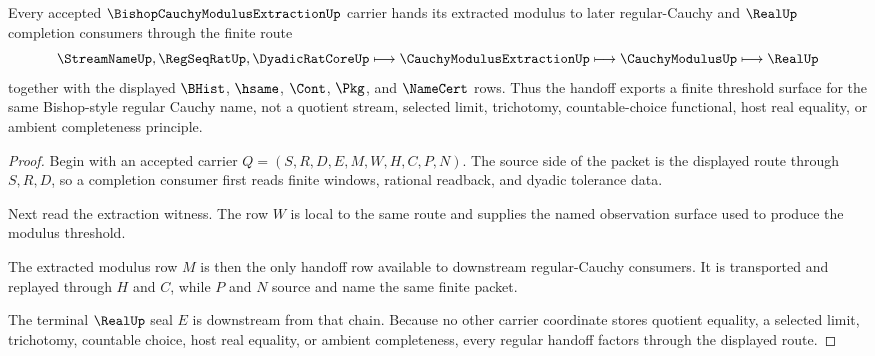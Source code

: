 \begin{theorem}
\label{thm:bishop-cauchy-modulus-extraction-regular-handoff}
Every accepted $\BishopCauchyModulusExtractionUp$ carrier hands its extracted modulus to later regular-Cauchy and $\RealUp$ completion consumers through the finite route
$$
\StreamNameUp,\RegSeqRatUp,\DyadicRatCoreUp
\longmapsto
\CauchyModulusExtractionUp
\longmapsto
\CauchyModulusUp
\longmapsto
\RealUp
$$
together with the displayed $\BHist$, $\hsame$, $\Cont$, $\Pkg$, and $\NameCert$ rows. Thus the handoff exports a finite threshold surface for the same Bishop-style regular Cauchy name, not a quotient stream, selected limit, trichotomy, countable-choice functional, host real equality, or ambient completeness principle.
\end{theorem}
\begin{proof}
Begin with an accepted carrier $Q=(S,R,D,E,M,W,H,C,P,N)$. The source side of the packet is the displayed route through $S,R,D$, so a completion consumer first reads finite windows, rational readback, and dyadic tolerance data.

Next read the extraction witness. The row $W$ is local to the same route and supplies the named observation surface used to produce the modulus threshold.

The extracted modulus row $M$ is then the only handoff row available to downstream regular-Cauchy consumers. It is transported and replayed through $H$ and $C$, while $P$ and $N$ source and name the same finite packet.

The terminal $\RealUp$ seal $E$ is downstream from that chain. Because no other carrier coordinate stores quotient equality, a selected limit, trichotomy, countable choice, host real equality, or ambient completeness, every regular handoff factors through the displayed route.
\end{proof}


